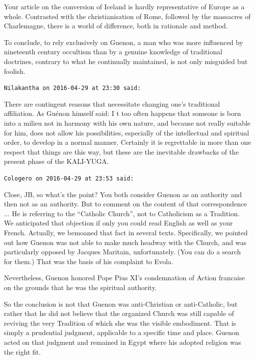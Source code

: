 \begin{footnotesize}
\begin{sffamily}
Your article on the conversion of Iceland is hardly representative of Europe as a whole. Contrasted with the christianisation of Rome, followed by the massacres of Charlemagne, there is a world of difference, both in rationale and method.

To conclude, to rely exclusively on Guenon, a man who was more influenced by nineteenth century occultism than by a genuine knowledge of traditional doctrines, contrary to what he continually maintained, is not only misguided but foolish.

\hfill

\texttt{Nilakantha on 2016-04-29 at 23:30 said:}

There are contingent reasons that necessitate changing one's traditional affiliation. As Guénon himself said: I t too often happens that someone is born into a milieu not in harmony with his own nature, and because not really suitable for him, does not allow his possibilities, especially of the intellectual and spiritual order, to develop in a normal manner. Certainly it is regrettable in more than one respect that things are this way, but these are the inevitable drawbacks of the present phase of the KALI-YUGA.

\hfill

\texttt{Cologero on 2016-04-29 at 23:53 said:}

Close, JB, so what's the point? You both consider Guenon as an authority and then not as an authority. But to comment on the content of that correspondence ... He is referring to the ``Catholic Church'', not to Catholicism as a Tradition. We anticipated that objection if only you could read English as well as your French. Actually, we bemoaned that fact in several texts. Specifically, we pointed out how Guenon was not able to make much headway with the Church, and was particularly opposed by Jacques Maritain, unfortunately. (You can do a search for them.) That was the basis of his complaint to Evola.

Nevertheless, Guenon honored Pope Pius XI's condemnation of Action francaise on the grounds that he was the spiritual authority.

So the conclusion is not that Guenon was anti-Christian or anti-Catholic, but rather that he did not believe that the organized Church was still capable of reviving the very Tradition of which she was the visible embodiment. That is simply a prudential judgment, applicable to a specific time and place. Guenon acted on that judgment and remained in Egypt where his adopted religion was the right fit.


\end{sffamily}
\end{footnotesize}
